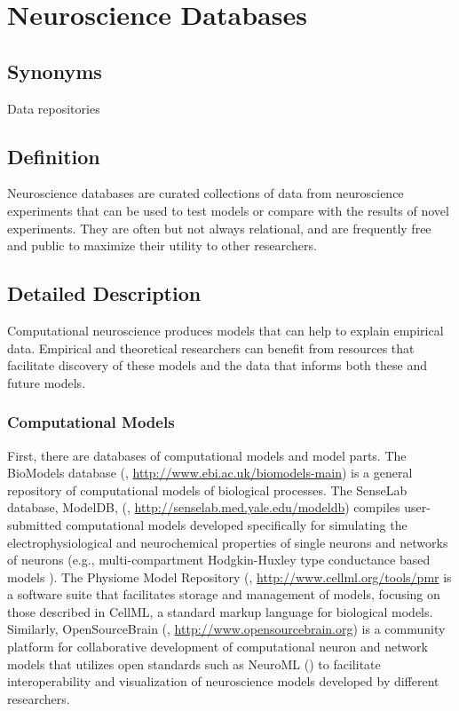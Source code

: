 \documentclass[12pt]{article}
\begin{document}
\section*{Neuroscience Databases}

\subsection*{Synonyms}
Data repositories

\subsection*{Definition}
Neuroscience databases are curated collections of data from neuroscience experiments that can be used to test models or compare with the results of novel experiments.  They are often but not always relational, and are frequently free and public to maximize their utility to other researchers.  

\subsection*{Detailed Description}

Computational neuroscience produces models that can help to explain empirical data. 
Empirical and theoretical researchers can benefit from resources that facilitate discovery of these models and the data that informs both these and future models.   

\subsubsection*{Computational Models}
First, there are databases of computational models and model parts.  
The BioModels database (\cite{BioModels2010,BioModels2013}, \url{http://www.ebi.ac.uk/biomodels-main}) is a general repository of computational models of biological processes.  
The SenseLab database, ModelDB, (\cite{migliore_modeldb_2003}, \url{http://senselab.med.yale.edu/modeldb}) compiles user-submitted computational models developed specifically for simulating the electrophysiological and neurochemical properties of single neurons and networks of neurons (e.g., multi-compartment Hodgkin-Huxley type conductance based models \cite{hodgkin_quantitative_1952}). 
The Physiome Model Repository (\cite{physiomemodelrepository_2011}, \url{http://www.cellml.org/tools/pmr} is a software suite that facilitates storage and management of models, focusing on those described in CellML, a standard markup language for biological models. 
Similarly, OpenSourceBrain (\cite{OSB_2012}, \url{http://www.opensourcebrain.org}) is a community platform for collaborative development of computational neuron and network models that utilizes open standards such as NeuroML (\cite{gleeson_neuroml:_2010}) to facilitate interoperability and visualization of neuroscience models developed by different researchers. 
\end{document}
